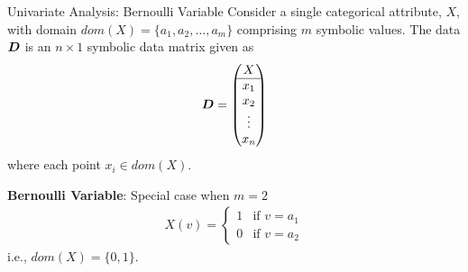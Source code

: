 
\date{Chapter 3: Categorical Attributes}

\begin{frame}
\titlepage
\end{frame}

\newcommand{\algentdisc}{\textsc{EntropyDiscretization}}
\newcommand{\algsetcut}{\textsc{SetCut}}


\begin{frame}{Univariate Analysis: Bernoulli Variable}
  Consider a single
categorical attribute, $X$, with
domain $dom(X) = \{a_1, a_2, \ldots, a_m\}$ comprising $m$ symbolic
values.
The data ${\boldsymbol D}$ is an $n \times 1$ symbolic data matrix given as
\begin{align*}
    {\boldsymbol D} = \begin{pmatrix} X\\
        \hline x_1\\x_2\\\vdots\\ x_n \end{pmatrix}
\end{align*}
where each point $x_i \in dom(X)$.


\bigskip
{\bf Bernoulli Variable}: Special case when $m=2$
\begin{align*}
    X(v) =
    \begin{cases}
        1 & \text{if } v=a_1\\
        0 & \text{if } v=a_2
    \end{cases}
\end{align*}
i.e., $dom(X)=\{0,1\}$.

\end{frame}


